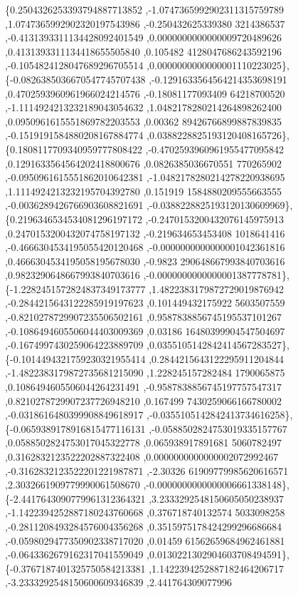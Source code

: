 \begin{DoxyCode}
\{0.2504326253393794887713852 ,-1.0747365992902311315759789 ,1.0747365992902320197543986 ,-0.250432625339380
      3214386537 ,-0.4131393311134428092401549 ,0.0000000000000009720489626 ,0.4131393311134418655505840 ,0.105482
      4128047686243592196 ,-0.1054824128047689296705514 ,0.0000000000000001110223025\},
\{-0.0826385036670547745707438 ,-0.1291633564564214353698191 ,0.4702593960961966024214576 ,-0.18081177093409
      64218700520 ,-1.1114924213232189043054632 ,1.0482178280214264898262400 ,0.0950961615551869782203553 ,0.00362
      89426766899887839835 ,-0.1519191584880208167884774 ,0.0388228825193120408165726\},
\{0.1808117709340959777808422 ,-0.4702593960961955477095842 ,0.1291633564564202418800676 ,0.0826385036670551
      770265902 ,-0.0950961615551862010642381 ,-1.0482178280214278220938695 ,1.1114924213232195704392780 ,0.151919
      1584880209555663555 ,-0.0036289426766903608821691 ,-0.0388228825193120130609969\},
\{0.2196346534534081296197172 ,-0.2470153200432076145975913 ,0.2470153200432074758197132 ,-0.219634653453408
      1018641416 ,-0.4666304534195055420120468 ,-0.0000000000000001042361816 ,0.4666304534195058195678030 ,-0.9823
      290648667993840703616 ,0.9823290648667993840703616 ,-0.0000000000000001387778781\},
\{-1.2282451572824837349173777 ,1.4822383179872729019876942 ,-0.2844215643122285919197623 ,0.101449432175922
      5603507559 ,-0.8210278729907235506502161 ,0.9587838856745195537101267 ,-0.1086494605506044403009369 ,0.03186
      16480399904547504697 ,-0.1674997430259064223889709 ,0.0355105142842414567283527\},
\{-0.1014494321759230321955414 ,0.2844215643122295911204844 ,-1.4822383179872735681215090 ,1.228245157282484
      1790065875 ,0.1086494605506044264231491 ,-0.9587838856745197757547317 ,0.8210278729907237726948210 ,0.167499
      7430259066166780002 ,-0.0318616480399908849618917 ,-0.0355105142842413734616258\},
\{-0.0659389178916815477116131 ,-0.0588502824753019335157767 ,0.0588502824753017045322778 ,0.065938917891681
      5060782497 ,0.3162832123522202887322408 ,0.0000000000000002072992467 ,-0.3162832123522201221987871 ,-2.30326
      61909779985620616571 ,2.3032661909779990061508670 ,-0.0000000000000006661338148\},
\{-2.4417643090779961312364321 ,3.2333292548150605050238937 ,-1.1422394252887180243760668 ,0.376718740132574
      5033098258 ,-0.2811208493284576004356268 ,0.3515975178424299296686684 ,-0.0598029477350902338717020 ,0.01459
      61562659684962461881 ,-0.0643362679162317041559049 ,0.0130221302904603708494591\},
\{-0.3767187401325750584213381 ,1.1422394252887182464206717 ,-3.2333292548150600609346839 ,2.441764309077996

\end{DoxyCode}
